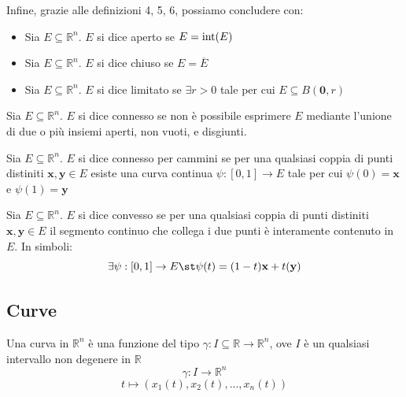         Infine, grazie alle definizioni 4, 5, 6, possiamo concludere con:
        \begin{itemize}
            \item Sia $E \subseteq \mathbb{R}^{n}$. $E$ si dice aperto se $E = \textnormal{int}(E)$
            \item Sia $E \subseteq \mathbb{R}^{n}$. $E$ si dice chiuso se $E = \overline{E}$
            \item Sia $E \subseteq \mathbb{R}^{n}$. $E$ si dice limitato se $\exists r > 0$ tale per cui $E \subseteq B(\mathbf{0}, r)$
        \end{itemize}

        \begin{definition}
            Sia $E \subseteq \mathbb{R}^{n}$. $E$ si dice connesso se non è possibile esprimere $E$ mediante l'unione di due o più insiemi aperti, non vuoti, e disgiunti.
        \end{definition}

        \begin{definition}
            Sia $E \subseteq \mathbb{R}^{n}$. $E$ si dice connesso per cammini se per una qualsiasi coppia di punti distiniti $\mathbf{x}, \mathbf{y} \in E$ esiste una curva continua $\psi: [0, 1] \rightarrow E$ tale per cui $\psi(0) = \mathbf{x}$ e $\psi(1) = \mathbf{y}$
        \end{definition}

        \begin{definition}
            Sia $E \subseteq \mathbb{R}^{n}$. $E$ si dice convesso se per una qualsiasi coppia di punti distiniti $\mathbf{x}, \mathbf{y} \in E$ il segmento continuo che collega i due punti è interamente contenuto in $E$. In simboli:
            \[
                \exists \psi: [0, 1] \rightarrow E \st \psi(t) = (1-t)\mathbf{x} + t(\mathbf{y})
            \]
        \end{definition}

    \subsection{Curve}
        Una curva in $\mathbb{R}^{n}$ è una funzione del tipo $\gamma: I \subseteq \mathbb{R} \rightarrow \mathbb{R}^{n}$, ove $I$ è un qualsiasi intervallo non degenere in $\mathbb{R}$
        \[
            \gamma: I \rightarrow \mathbb{R}^{n}
        \]
        \[
            t \mapsto (x_1(t), x_2(t), ..., x_n(t))
        \]

